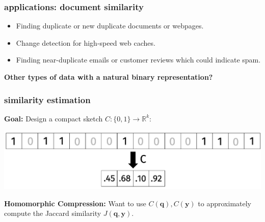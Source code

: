 \documentclass[handout,compress]{beamer}
\newcommand{\bv}[1]{\mathbf{#1}}
\newcommand{\R}{\mathbb{R}}
\begin{document}
\begin{frame}
	\frametitle{applications: document similarity}
	\begin{itemize}
		\item Finding duplicate or new duplicate documents or webpages.
		\item Change detection for high-speed web caches.
		\item Finding near-duplicate emails or customer reviews which could indicate spam.
	\end{itemize}

\begin{center}
	\textbf{Other types of data with a natural binary representation?}
\end{center}
\end{frame}


\begin{frame}
	\frametitle{similarity estimation}
	\textbf{Goal:} Design a compact sketch $C: \{0,1\}\rightarrow \R^k$:
	\begin{center}
		\vspace{-.5em}
		\includegraphics[width=.8\textwidth]{compression.png}
		\vspace{-.5em}
	\end{center}
	\textbf{Homomorphic Compression:} 
	Want to use $C(\bv{q}), C(\bv{y})$ to approximately compute the Jaccard similarity $J(\bv{q},\bv{y})$.
\end{frame}
\end{document}
